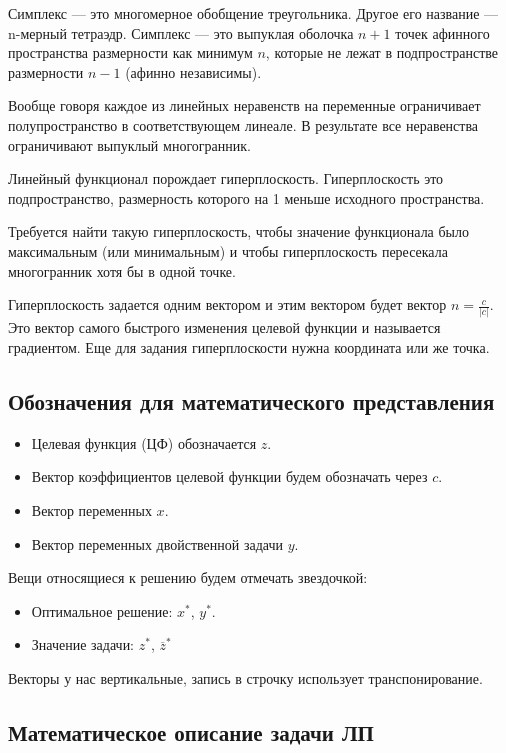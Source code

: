 \documentclass[a4paper,article,14pt]{extarticle}
\begin{document}
Симплекс --- это многомерное обобщение треугольника.
Другое его название --- n-мерный тетраэдр.
Симплекс --- это выпуклая оболочка \(n+1\) точек афинного пространства размерности как минимум \(n\), которые не лежат в подпространстве размерности \(n-1\) (афинно независимы).

Вообще говоря каждое из линейных неравенств на переменные ограничивает полупространство в соответствующем линеале.
В результате все неравенства ограничивают выпуклый многогранник.

Линейный функционал порождает гиперплоскость.
Гиперплоскость это подпространство, размерность которого на 1 меньше исходного пространства.

Требуется найти такую гиперплоскость, чтобы значение функционала было максимальным (или минимальным) и чтобы гиперплоскость пересекала многогранник хотя бы в одной точке.

Гиперплоскость задается одним вектором и этим вектором будет вектор \(n = \frac c {|c|}\). Это вектор самого быстрого изменения целевой функции и называется градиентом.
Еще для задания гиперплоскости нужна координата или же точка.

\subsection{Обозначения для математического представления}

\begin{itemize}
    \item Целевая функция (ЦФ) обозначается \(z\).
    \item Вектор коэффициентов целевой функции будем обозначать через \(c\).
    \item Вектор переменных \(x\).
    \item Вектор переменных двойственной задачи \(y\).
\end{itemize}

Вещи относящиеся к решению будем отмечать звездочкой:

\begin{itemize}
    \item Оптимальное решение: \(x^*\), \(y^*\).
    \item Значение задачи: \(z^*\), \(\overline z^*\)
\end{itemize}

Векторы у нас вертикальные, запись в строчку использует транспонирование.

\subsection{Математическое описание задачи ЛП}
\end{document}
